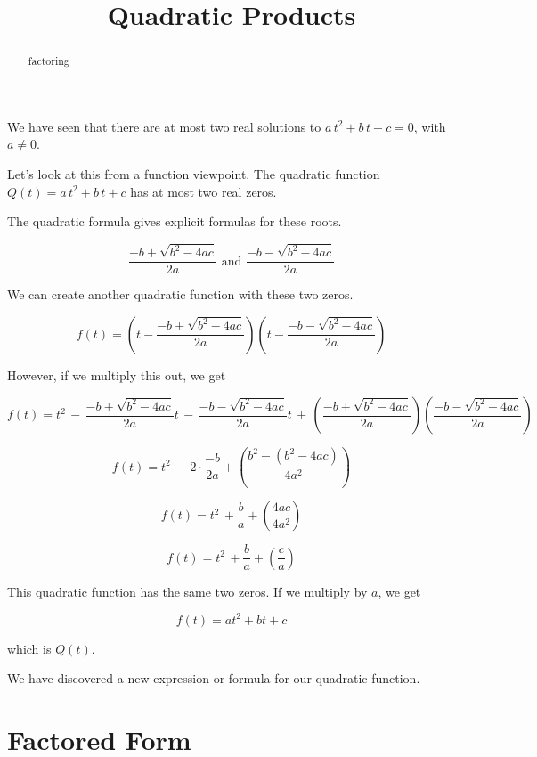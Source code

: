 \documentclass{ximera}
\title{Quadratic Products}
\begin{document}
\begin{abstract}
factoring
\end{abstract}
\maketitle





We have seen that there are at most two real solutions to $a \, t^2 + b \, t + c = 0$, with $a \ne 0$. 

Let's look at this from a function viewpoint.  The quadratic function  $Q(t) = a \, t^2 + b \, t + c$ has at most two real zeros.  

The quadratic formula gives explicit formulas for these roots.


\[   \frac{-b + \sqrt{b^2 - 4 a c}}{2a}     \text{ and }    \frac{-b - \sqrt{b^2 - 4 a c}}{2a}   \]



We can create another quadratic function with these two zeros.



\[ f(t) =  \left(t - \frac{-b + \sqrt{b^2 - 4 a c}}{2a}\right)   \left(t -  \frac{-b - \sqrt{b^2 - 4 a c}}{2a}\right)   \]


However, if we multiply this out, we get



\[ f(t) =   t^2 \, - \, \frac{-b + \sqrt{b^2 - 4 a c}}{2a} t \, - \, \frac{-b - \sqrt{b^2 - 4 a c}}{2a}  t \, + \, \left(\frac{-b + \sqrt{b^2 - 4 a c}}{2a}\right) \left(\frac{-b - \sqrt{b^2 - 4 a c}}{2a}\right) \]


\[ f(t) = t^2  \, - \, 2 \cdot \frac{-b}{2a} + \left(    \frac{b^2 - (b^2 - 4 a c)}{4 a^2}     \right)        \]


\[ f(t) = t^2  \, + \frac{b}{a} + \left(    \frac{4 a c}{4 a^2}     \right)        \]

\[ f(t) = t^2  \, +  \frac{b}{a} + \left(    \frac{c}{a}     \right)        \]


This quadratic function has the same two zeros.  If we multiply by $a$, we get 


\[ f(t) = a t^2 + b t + c \]

which is $Q(t)$.


We have discovered a new expression or formula for our quadratic function.



\section{Factored Form}
\end{document}
